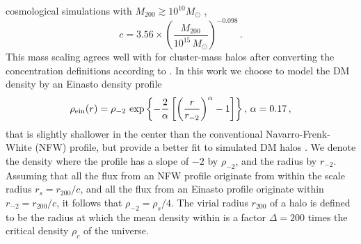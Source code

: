 \documentclass[10pt,aps,pra,reprint,amsmath,amsfonts,amssymb,showpacs]{revtex4-1}
\newcommand{\msun}{M_\odot}
\newcommand{\rhos}{\ensuremath{\rho_s}}
\newcommand{\rs}{\ensuremath{r_s}}
\newcommand{\rvir}{r_{200}}
\newcommand{\mvir}{M_{200}}
\newcommand{\rhoc}{\ensuremath{\rho_c}}
\begin{document}
cosmological simulations with $\mvir \gtrsim 10^{10} \msun$
\cite{2008MNRAS.391.1940M},
\begin{equation}
\label{eq:cfit}
  c=3.56 \times \left(\frac{\mvir}{10^{15}\,\msun}\right)^{-0.098}\,.
\end{equation}
This mass scaling agrees well with \cite{2009ApJ...707..354Z} for
cluster-mass halos after converting the concentration definitions
according to \cite{2003ApJ...584..702H}. In this work we choose to
model the DM density by an Einasto density profile
\begin{equation}
\rho_{\rm ein}(r) = \rho_{-2}\,\exp\left\{-\frac{2}{\alpha}
  \left[\left(\frac{r}{r_{-2}}\right)^\alpha -1 \right] \right\},\,
\alpha=0.17 \,,
\end{equation}
that is slightly shallower in the center than the conventional
Navarro-Frenk-White (NFW) profile, but provide a better fit to
simulated DM halos \cite{2010MNRAS.402...21N}. We denote the density
where the profile has a slope of $-2$ by $\rho_{-2}$, and the radius
by $r_{-2}$. Assuming that all the flux from an NFW profile originate
from within the scale radius $\rs=\rvir/c$, and all the flux from an
Einasto profile originate within $r_{-2}=\rvir/c$, it follows that
$\rho_{-2} = \rhos/4$. The virial radius $\rvir$ of a halo is defined
to be the radius at which the mean density within is a factor
$\Delta=200$ times the critical density $\rhoc$ of the universe.
\end{document}
